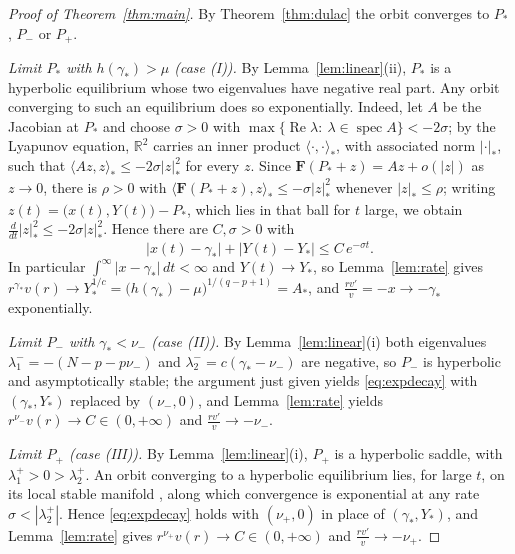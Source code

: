 \documentclass[11pt,reqno]{amsart}
\numberwithin{equation}{section}
\theoremstyle{plain}
\theoremstyle{definition}
\newcommand{\R}{\mathbb{R}}
\newcommand{\gs}{\gamma_{*}}
\begin{document}
\begin{proof}[Proof of Theorem~\ref{thm:main}]
By Theorem~\ref{thm:dulac} the orbit converges to $P_{*}$, $P_{-}$ or $P_{+}$.

\smallskip
\noindent\emph{Limit $P_{*}$ with $h(\gs)>\mu$ (case (I)).} By
Lemma~\ref{lem:linear}(ii), $P_{*}$ is a hyperbolic equilibrium whose two
eigenvalues have negative real part. Any orbit converging to such an
equilibrium does so exponentially. Indeed, let $A$ be the Jacobian at $P_{*}$
and choose $\sigma>0$ with $\max\{\operatorname{Re}\lambda:\ \lambda\in
\operatorname{spec}A\}<-2\sigma$; by the Lyapunov equation, $\R^{2}$ carries an
inner product $\langle\cdot,\cdot\rangle_{*}$, with associated norm
$|\cdot|_{*}$, such that $\langle Az,z\rangle_{*}\le-2\sigma|z|_{*}^{2}$ for
every $z$. Since $\mathbf F(P_{*}+z)=Az+o(|z|)$ as $z\to0$, there is $\rho>0$
with $\langle\mathbf F(P_{*}+z),z\rangle_{*}\le-\sigma|z|_{*}^{2}$ whenever
$|z|_{*}\le\rho$; writing $z(t)=\big(x(t),Y(t)\big)-P_{*}$, which lies in that
ball for $t$ large, we obtain
$\frac{d}{dt}|z|_{*}^{2}\le-2\sigma|z|_{*}^{2}$. Hence there are
$C,\sigma>0$ with
\begin{equation}\label{eq:expdecay}
|x(t)-\gs|+|Y(t)-Y_{*}|\le C\,e^{-\sigma t}.
\end{equation}
In particular $\int^{\infty}|x-\gs|\,dt<\infty$ and $Y(t)\to Y_{*}$, so
Lemma~\ref{lem:rate} gives
$r^{\gs}v(r)\to Y_{*}^{1/c}=\big(h(\gs)-\mu\big)^{1/(q-p+1)}=A_{*}$, and
$\frac{rv'}{v}=-x\to-\gs$ exponentially.

\smallskip
\noindent\emph{Limit $P_{-}$ with $\gs<\nu_{-}$ (case (II)).} By
Lemma~\ref{lem:linear}(i) both eigenvalues
$\lambda_{1}^{-}=-(N-p-p\nu_{-})$ and $\lambda_{2}^{-}=c(\gs-\nu_{-})$ are
negative, so $P_{-}$ is hyperbolic and asymptotically stable; the argument just
given yields \eqref{eq:expdecay} with $(\gs,Y_{*})$ replaced by
$(\nu_{-},0)$, and Lemma~\ref{lem:rate} yields
$r^{\nu_{-}}v(r)\to C\in(0,+\infty)$ and $\frac{rv'}{v}\to-\nu_{-}$.

\smallskip
\noindent\emph{Limit $P_{+}$ (case (III)).} By Lemma~\ref{lem:linear}(i),
$P_{+}$ is a hyperbolic saddle, with $\lambda_{1}^{+}>0>\lambda_{2}^{+}$. An
orbit converging to a hyperbolic equilibrium lies, for large $t$, on its local
stable manifold \cite[Ch.~IX]{Hartman}, along which convergence is exponential
at any rate $\sigma<|\lambda_{2}^{+}|$. Hence \eqref{eq:expdecay} holds with
$(\nu_{+},0)$ in place of $(\gs,Y_{*})$, and Lemma~\ref{lem:rate} gives
$r^{\nu_{+}}v(r)\to C\in(0,+\infty)$ and $\frac{rv'}{v}\to-\nu_{+}$.


\end{proof}
\end{document}
